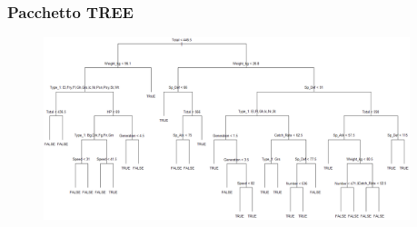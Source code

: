 	\begin{frame}
	\frametitle{Pacchetto TREE}
		\begin{center}
			\begin{figure}
				
			\end{figure}
			\begin{figure}
				\includegraphics[width=0.95\textwidth]{img/treeGini}
			\end{figure}
		\end{center}
	\end{frame}

